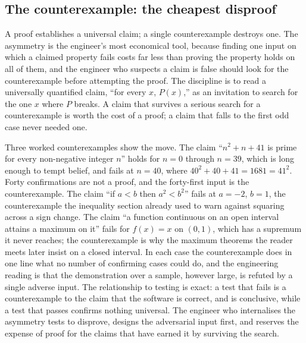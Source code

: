 \subsection{The counterexample: the cheapest disproof}

A proof establishes a universal claim; a single counterexample destroys
one. The asymmetry is the engineer's most economical tool, because
finding one input on which a claimed property fails costs far less than
proving the property holds on all of them, and the engineer who suspects
a claim is false should look for the counterexample before attempting
the proof. The discipline is to read a universally quantified claim,
``for every $x$, $P(x)$,'' as an invitation to search for the one $x$
where $P$ breaks. A claim that survives a serious search for a
counterexample is worth the cost of a proof; a claim that falls to the
first odd case never needed one.

Three worked counterexamples show the move. The claim ``$n^{2} + n + 41$
is prime for every non-negative integer $n$'' holds for $n = 0$ through
$n = 39$, which is long enough to tempt belief, and fails at $n = 40$,
where $40^{2} + 40 + 41 = 1681 = 41^{2}$. Forty confirmations are not a
proof, and the forty-first input is the counterexample. The claim ``if
$a < b$ then $a^{2} < b^{2}$'' fails at $a = -2$, $b = 1$, the
counterexample the inequality section already used to warn against
squaring across a sign change. The claim ``a function continuous on an
open interval attains a maximum on it'' fails for $f(x) = x$ on $(0,
1)$, which has a supremum it never reaches; the counterexample is why the
maximum theorems the reader meets later insist on a closed interval. In
each case the counterexample does in one line what no number of
confirming cases could do, and the engineering reading is that the
demonstration over a sample, however large, is refuted by a single
adverse input. The relationship to testing is exact: a test that fails
is a counterexample to the claim that the software is correct, and is
conclusive, while a test that passes confirms nothing universal. The
engineer who internalises the asymmetry tests to disprove, designs the
adversarial input first, and reserves the expense of proof for the
claims that have earned it by surviving the search.

